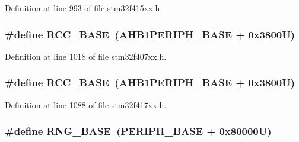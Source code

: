 Definition at line 993 of file stm32f415xx.\+h.

\subsubsection[{\texorpdfstring{R\+C\+C\+\_\+\+B\+A\+SE}{RCC_BASE}}]{\setlength{\rightskip}{0pt plus 5cm}\#define R\+C\+C\+\_\+\+B\+A\+SE~({\bf A\+H\+B1\+P\+E\+R\+I\+P\+H\+\_\+\+B\+A\+SE} + 0x3800\+U)}\hypertarget{group___peripheral__registers__structures_ga0e681b03f364532055d88f63fec0d99d}{}\label{group___peripheral__registers__structures_ga0e681b03f364532055d88f63fec0d99d}


Definition at line 1018 of file stm32f407xx.\+h.

\subsubsection[{\texorpdfstring{R\+C\+C\+\_\+\+B\+A\+SE}{RCC_BASE}}]{\setlength{\rightskip}{0pt plus 5cm}\#define R\+C\+C\+\_\+\+B\+A\+SE~({\bf A\+H\+B1\+P\+E\+R\+I\+P\+H\+\_\+\+B\+A\+SE} + 0x3800\+U)}\hypertarget{group___peripheral__registers__structures_ga0e681b03f364532055d88f63fec0d99d}{}\label{group___peripheral__registers__structures_ga0e681b03f364532055d88f63fec0d99d}


Definition at line 1088 of file stm32f417xx.\+h.

\subsubsection[{\texorpdfstring{R\+N\+G\+\_\+\+B\+A\+SE}{RNG_BASE}}]{\setlength{\rightskip}{0pt plus 5cm}\#define R\+N\+G\+\_\+\+B\+A\+SE~({\bf P\+E\+R\+I\+P\+H\+\_\+\+B\+A\+SE} + 0x80000\+U)}\hypertarget{group___peripheral__registers__structures_gab92662976cfe62457141e5b4f83d541c}{}\label{group___peripheral__registers__structures_gab92662976cfe62457141e5b4f83d541c}



